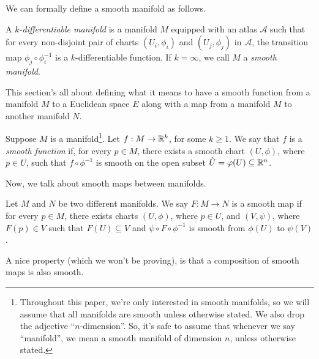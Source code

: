 We can formally define a smooth manifold as follows.

\begin{definition}
  A \emph{$k$-differentiable manifold} is a manifold $M$ equipped with an atlas $\mathcal{A}$ such that for every non-disjoint pair of charts $(U_i, \phi_i)$ and $(U_j, \phi_j)$ in $\mathcal{A}$, the transition map $\phi_j \circ \phi_i^{-1}$ is a $k$-differentiable function. If $k = \infty$, we call $M$ a \emph{smooth manifold}.
\end{definition}

\label{sub_sec:smooth_functions_and_maps} This section's all about defining what it means to have a smooth function from a manifold $M$ to a Euclidean space $E$ along with a map from a manifold $M$ to another manifold $N$.

\begin{definition}
  Suppose $M$ is a manifold\footnote{Throughout this paper, we're only interested in smooth manifolds, so we will assume that all manifolds are smooth unless otherwise stated. We also drop the adjective ``$n$-dimension''. So, it's safe to assume that whenever we say ``manifold'', we mean a smooth manifold of dimension $n$, unless otherwise stated.}. Let $f : M \rightarrow \mathbb{R}^k$, for some $k \ge 1$. We say that $f$ is a \emph{smooth function} if, for every $p \in M$, there exists a smooth chart $(U, \phi)$, where $p \in U$, such that $f \circ \phi^{-1}$ is smooth on the open subset $\hat{U} = \varphi(U) \subseteq \mathbb{R}^n$.
\end{definition}


Now, we talk about smooth maps between manifolds.

\begin{definition}
  Let $M$ and $N$ be two different manifolds. We say $F : M \to N$ is a smooth map if for every $p \in M$, there exists charts $(U, \phi)$, where $p \in U$, and $(V, \psi)$, where $F(p) \in V$ such that $F(U) \subseteq V$ and $\psi \circ F \circ \phi^{-1}$ is smooth from $\phi(U)$ to $\psi(V)$.
\end{definition}


A nice property (which we won't be proving), is that a composition of smooth maps is also smooth.


